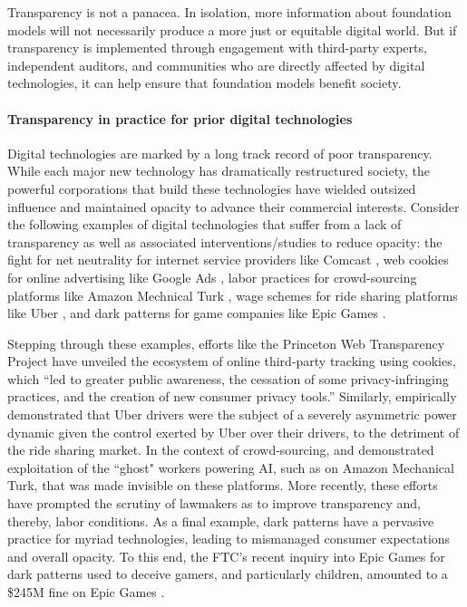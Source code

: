 \documentclass[screen, authorversion, acmsmall]{acmart}
\begin{document}
Transparency is not a panacea. 
In isolation, more information about foundation models will not necessarily produce a more just or equitable digital world. 
But if transparency is implemented through engagement with third-party experts, independent auditors, and communities who are directly affected by digital technologies, it can help ensure that foundation models benefit society.

\paragraph{Transparency in practice for prior digital technologies}
Digital technologies are marked by a long track record of poor transparency.
While each major new technology has dramatically restructured society, the powerful corporations that build these technologies have wielded outsized influence and maintained opacity to advance their commercial interests.
Consider the following examples of digital technologies that suffer from a lack of transparency as well as associated interventions/studies to reduce opacity:
the fight for net neutrality for internet service providers like Comcast \citep{crs2021netneutrality}, web cookies for online advertising like Google Ads \citep{englehardt2015cookies,englehardt2016online,narayanan2017princeton}, labor practices for crowd-sourcing platforms like Amazon Mechnical Turk \citep{gray2019ghost, crawford2021atlas}, wage schemes for ride sharing platforms like Uber \citep{rosenblat2016algorithmic}, and dark patterns for game companies like Epic Games \citep{ftc2023epicgames}.

Stepping through these examples, efforts like the Princeton Web Transparency Project \citep{englehardt2015cookies,englehardt2016online,narayanan2017princeton} have unveiled the ecosystem of online third-party tracking using cookies, which ``led to greater public awareness, the cessation of some privacy-infringing
practices, and the creation of new consumer privacy tools.''
Similarly, \citet{rosenblat2016algorithmic} empirically demonstrated that Uber drivers were the subject of a severely asymmetric power dynamic given the control exerted by Uber over their drivers, to the detriment of the ride sharing market.
In the context of crowd-sourcing, \citet{gray2019ghost} and \citet{crawford2021atlas} demonstrated exploitation of the ``ghost" workers powering AI, such as on Amazon Mechanical Turk, that was made invisible on these platforms.
More recently, these efforts have prompted the scrutiny of lawmakers as to improve transparency and, thereby, labor conditions.
As a final example, dark patterns have a pervasive practice for myriad technologies, leading to mismanaged consumer expectations and overall opacity. 
To this end, the FTC's recent inquiry into Epic Games for dark patterns used to deceive gamers, and particularly children, amounted to a \$245M fine on Epic Games \citep{ftc2023epicgames}.
\end{document}

